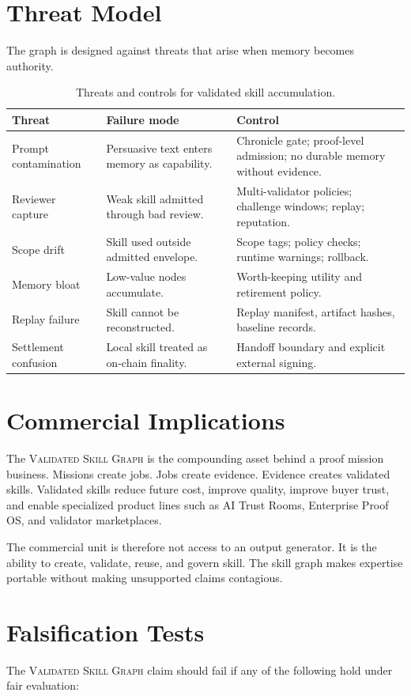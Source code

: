 \documentclass[10.5pt,oneside]{article}
\newcommand{\vsg}{\textsc{Validated Skill Graph}}
\begin{document}
\section{Threat Model}
The graph is designed against threats that arise when memory becomes authority.

\begin{table}[H]
\centering
\small
\caption{Threats and controls for validated skill accumulation.}
\begin{tabularx}{\textwidth}{@{}p{}X X@{}}
\toprule
\textbf{Threat} & \textbf{Failure mode} & \textbf{Control} \\
\midrule
Prompt contamination & Persuasive text enters memory as capability. & Chronicle gate; proof-level admission; no durable memory without evidence. \\
Reviewer capture & Weak skill admitted through bad review. & Multi-validator policies; challenge windows; replay; reputation. \\
Scope drift & Skill used outside admitted envelope. & Scope tags; policy checks; runtime warnings; rollback. \\
Memory bloat & Low-value nodes accumulate. & Worth-keeping utility and retirement policy. \\
Replay failure & Skill cannot be reconstructed. & Replay manifest, artifact hashes, baseline records. \\
Settlement confusion & Local skill treated as on-chain finality. & Handoff boundary and explicit external signing. \\
\bottomrule
\end{tabularx}
\end{table}

\section{Commercial Implications}
The \vsg{} is the compounding asset behind a proof mission business. Missions create jobs. Jobs create evidence. Evidence creates validated skills. Validated skills reduce future cost, improve quality, improve buyer trust, and enable specialized product lines such as AI Trust Rooms, Enterprise Proof OS, and validator marketplaces.

The commercial unit is therefore not access to an output generator. It is the ability to create, validate, reuse, and govern skill. The skill graph makes expertise portable without making unsupported claims contagious.

\section{Falsification Tests}
The \vsg{} claim should fail if any of the following hold under fair evaluation:
\end{document}
